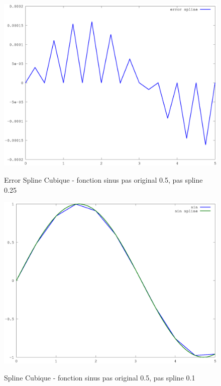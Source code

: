 \documentclass[a4paper,11pt]{article}
\begin{document}
\begin{figure}[h!]
  \begin{centering}
    \includegraphics[scale=0.5]{../sinus_2_error}
    \label{rspro2}
    \par\end{centering}
  \caption{Error Spline Cubique - fonction sinus pas original 0.5, pas spline 0.25}
  \label{fig:jacobi-conv}
\end{figure}


\begin{figure}[h!]
  \begin{centering}
    \includegraphics[scale=0.5]{../sinus_5}
    \label{rspro2}
    \par\end{centering}
  \caption{Spline Cubique - fonction sinus pas original 0.5, pas spline 0.1}
  \label{fig:jacobi-conv}
\end{figure}
\end{document}
